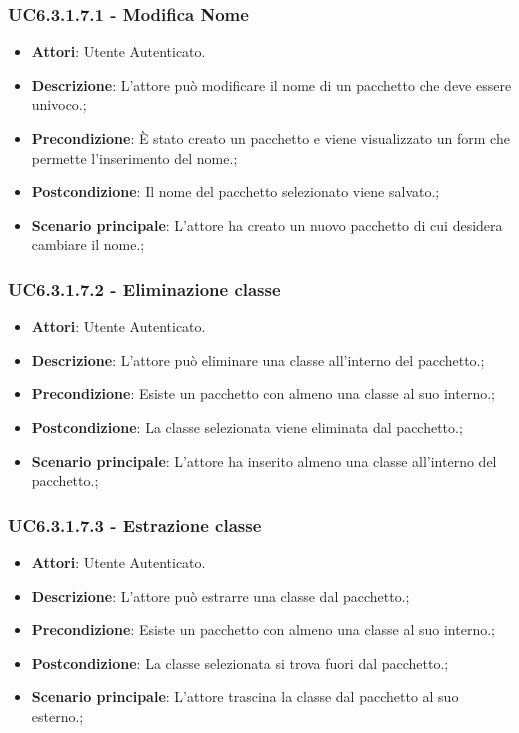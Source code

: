 \subsubsection{UC6.3.1.7.1 - Modifica Nome} 
\label{sssec:UC6.3.1.7.1} 
\begin{itemize} 
\item \textbf{Attori}: Utente Autenticato.
\item \textbf{Descrizione}: L'attore può modificare il nome di un pacchetto che deve essere univoco.;
\item \textbf{Precondizione}: È stato creato un pacchetto e viene visualizzato un form che permette l'inserimento del nome.;
\item \textbf{Postcondizione}: Il nome del pacchetto selezionato viene salvato.;
\item \textbf{Scenario principale}: L'attore ha creato un nuovo pacchetto di cui desidera cambiare il nome.;\end{itemize} 
\subsubsection{UC6.3.1.7.2 - Eliminazione classe} 
\label{sssec:UC6.3.1.7.2} 
\begin{itemize} 
\item \textbf{Attori}: Utente Autenticato.
\item \textbf{Descrizione}: L'attore può eliminare una classe all'interno del pacchetto.;
\item \textbf{Precondizione}: Esiste un pacchetto con almeno una classe al suo interno.;
\item \textbf{Postcondizione}: La classe selezionata viene eliminata dal pacchetto.;
\item \textbf{Scenario principale}: L'attore ha inserito almeno una classe all'interno del pacchetto.;\end{itemize} 
\subsubsection{UC6.3.1.7.3 - Estrazione classe} 
\label{sssec:UC6.3.1.7.3} 
\begin{itemize} 
\item \textbf{Attori}: Utente Autenticato.
\item \textbf{Descrizione}: L'attore può estrarre una classe dal pacchetto.;
\item \textbf{Precondizione}: Esiste un pacchetto con almeno una classe al suo interno.;
\item \textbf{Postcondizione}: La classe selezionata si trova fuori dal pacchetto.;
\item \textbf{Scenario principale}: L'attore trascina la classe dal pacchetto al suo esterno.;\end{itemize} 
